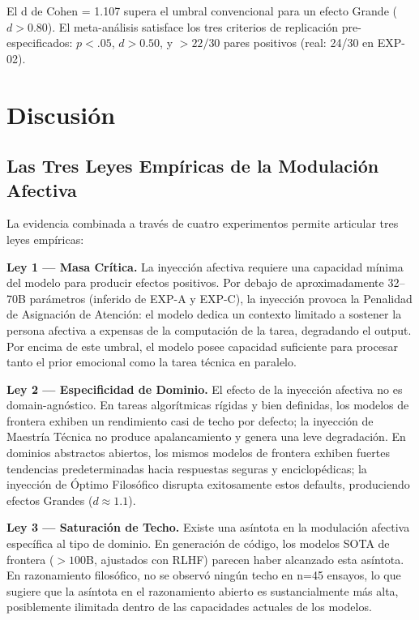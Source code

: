 \documentclass[12pt, a4paper]{article}
\begin{document}
El d de Cohen = 1.107 supera el umbral convencional para un efecto Grande ($d > 0.80$). El meta-análisis satisface los tres criterios de replicación pre-especificados: $p < .05$, $d > 0.50$, y $>22/30$ pares positivos (real: 24/30 en EXP-02).

\section{Discusión}

\subsection{Las Tres Leyes Empíricas de la Modulación Afectiva}

La evidencia combinada a través de cuatro experimentos permite articular tres leyes empíricas:

\textbf{Ley 1 — Masa Crítica.} La inyección afectiva requiere una capacidad mínima del modelo para producir efectos positivos. Por debajo de aproximadamente 32–70B parámetros (inferido de EXP-A y EXP-C), la inyección provoca la Penalidad de Asignación de Atención: el modelo dedica un contexto limitado a sostener la persona afectiva a expensas de la computación de la tarea, degradando el output. Por encima de este umbral, el modelo posee capacidad suficiente para procesar tanto el prior emocional como la tarea técnica en paralelo.

\textbf{Ley 2 — Especificidad de Dominio.} El efecto de la inyección afectiva no es domain-agnóstico. En tareas algorítmicas rígidas y bien definidas, los modelos de frontera exhiben un rendimiento casi de techo por defecto; la inyección de Maestría Técnica no produce apalancamiento y genera una leve degradación. En dominios abstractos abiertos, los mismos modelos de frontera exhiben fuertes tendencias predeterminadas hacia respuestas seguras y enciclopédicas; la inyección de Óptimo Filosófico disrupta exitosamente estos defaults, produciendo efectos Grandes ($d \approx 1.1$).

\textbf{Ley 3 — Saturación de Techo.} Existe una asíntota en la modulación afectiva específica al tipo de dominio. En generación de código, los modelos SOTA de frontera ($>100$B, ajustados con RLHF) parecen haber alcanzado esta asíntota. En razonamiento filosófico, no se observó ningún techo en n=45 ensayos, lo que sugiere que la asíntota en el razonamiento abierto es sustancialmente más alta, posiblemente ilimitada dentro de las capacidades actuales de los modelos.
\end{document}
